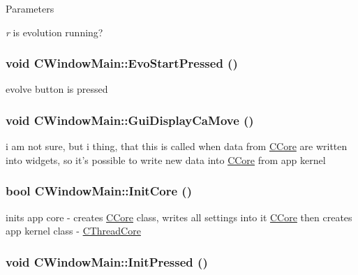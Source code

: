 \begin{DoxyParams}{Parameters}
\item[{\em r}]is evolution running? \end{DoxyParams}
\hypertarget{classCWindowMain_ad9734902625a60d83e0d537d74865e31}{
\subsubsection[{EvoStartPressed}]{\setlength{\rightskip}{0pt plus 5cm}void CWindowMain::EvoStartPressed ()}}
\label{classCWindowMain_ad9734902625a60d83e0d537d74865e31}
evolve button is pressed \hypertarget{classCWindowMain_a321e1a1a2653cde8054d27f4125094f4}{
\subsubsection[{GuiDisplayCaMove}]{\setlength{\rightskip}{0pt plus 5cm}void CWindowMain::GuiDisplayCaMove ()}}
\label{classCWindowMain_a321e1a1a2653cde8054d27f4125094f4}
i am not sure, but i thing, that this is called when data from \hyperlink{classCCore}{CCore} are written into widgets, so it's possible to write new data into \hyperlink{classCCore}{CCore} from app kernel \hypertarget{classCWindowMain_a7a64b7f7d3cb7b2094f4a2a347e357ce}{
\subsubsection[{InitCore}]{\setlength{\rightskip}{0pt plus 5cm}bool CWindowMain::InitCore ()}}
\label{classCWindowMain_a7a64b7f7d3cb7b2094f4a2a347e357ce}
inits app core -\/ creates \hyperlink{classCCore}{CCore} class, writes all settings into it \hyperlink{classCCore}{CCore} then creates app kernel class -\/ \hyperlink{classCThreadCore}{CThreadCore} \hypertarget{classCWindowMain_abd0c204fff950b8b26b0dc8bd7642afd}{
\subsubsection[{InitPressed}]{\setlength{\rightskip}{0pt plus 5cm}void CWindowMain::InitPressed ()}}
